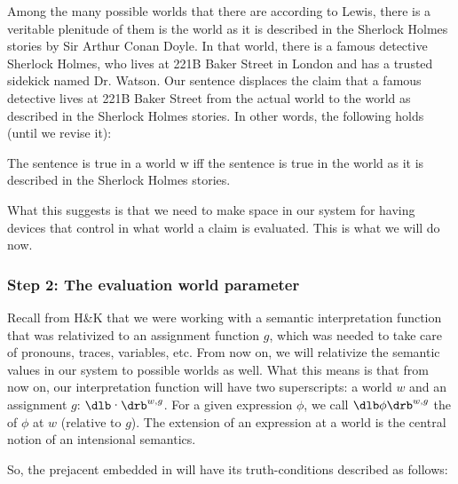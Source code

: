 Among the many possible worlds that there are \dash according to Lewis, there is
a veritable plenitude of them \dash is the world as it is described in the
Sherlock Holmes stories by Sir Arthur Conan Doyle. In that world, there is a
famous detective Sherlock Holmes, who lives at 221B Baker Street in London and
has a trusted sidekick named Dr. Watson. Our sentence  displaces the
claim that a famous detective lives at 221B Baker Street from the actual world
to the world as described in the Sherlock Holmes stories. In other words, the
following holds (until we revise it):

\ex The sentence  is true in a world w iff the sentence  is true in the world as it is described
in the Sherlock Holmes stories. \xe

What this suggests is that we need to make space in our system for having
devices that control in what world a claim is evaluated. This is what we will do
now.

\subsubsection{Step 2: The evaluation world parameter}
\label{sec:eval-world-param}

Recall from H\&K that we were working with a semantic interpretation function
that was relativized to an assignment function $g$, which was needed to take
care of pronouns, traces, variables, etc. From now on, we will relativize the
semantic values in our system to possible worlds as well. What this means is
that from now on, our interpretation function will have two superscripts: a
world $w$ and an assignment $g$: $\svt{\textperiodcentered}^{w,g}$. For a given
expression $\phi$, we call $\sv{\phi}^{w,g}$ the  of $\phi$ at $w$
(relative to $g$). The extension of an expression at a world is the central
notion of an intensional semantics. 

\clearpage
{}%
So, the prejacent embedded in  will have its truth-conditions
described as follows:

